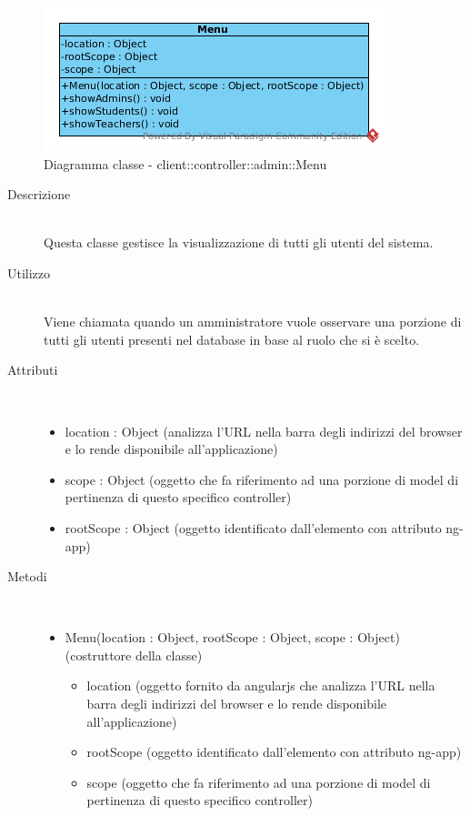 \vspace{0.5cm}
\hypertarget{client::controller::admin::Menu}{}
\begin{center}
			\begin{figure}[H]
				\centering \includegraphics[scale=4, max width=\textwidth, max height=\myheight]{../img/diagrammiClassi/client/controller/admin/Menu.png}
				\caption{Diagramma classe - client::controller::admin::Menu}
			\end{figure}
		\end{center}\begin{description}
\item[Descrizione] \hfill \\
 Questa classe gestisce la visualizzazione di tutti gli utenti del sistema.
\item[Utilizzo] \hfill \\
 Viene chiamata quando un amministratore vuole osservare una porzione di tutti gli utenti presenti nel database in base al ruolo che si è scelto.
\item[Attributi] \hfill \\
 \vspace{-7mm}
\begin{itemize}
\item location : Object (analizza l'URL nella barra degli indirizzi del browser e lo rende disponibile all'applicazione)
\item scope : Object (oggetto che fa riferimento ad una porzione di model di pertinenza di questo specifico controller)
\item rootScope : Object (oggetto identificato dall’elemento con attributo ng-app)
\end{itemize}

\item[Metodi] \hfill \\
 \vspace{-7mm}
\begin{itemize}
\item Menu(location : Object, rootScope : Object, scope : Object) (costruttore della classe)\begin{itemize}
\item location (oggetto fornito da angularjs che analizza l'URL nella barra degli indirizzi del browser e lo rende disponibile all'applicazione)
\item rootScope (oggetto identificato dall’elemento con attributo ng-app)
\item scope (oggetto che fa riferimento ad una porzione di model di pertinenza di questo specifico controller)
\end{itemize}


\end{itemize}
\end{description}
